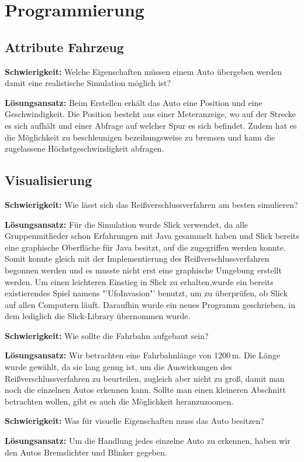 \chapter{Programmierung}
\section{Attribute Fahrzeug}
\textbf{Schwierigkeit:} Welche Eigenschaften müssen einem Auto übergeben werden damit eine realistische Simulation möglich ist?
\begin{addmargin}[25pt]{0pt}
	\item \textbf{Lösungsansatz:} Beim Erstellen erhält das Auto eine Position und eine Geschwindigkeit. Die Position besteht aus einer Meteranzeige, wo auf der Strecke es sich aufhält und einer Abfrage auf welcher Spur es sich befindet. Zudem hat es die Möglichkeit zu beschleunigen bezeihungsweise zu bremsen und kann die zugelassene Höchstgeschwindigkeit abfragen. \\
\end{addmargin}

\section{Visualisierung}
\textbf{Schwierigkeit:} Wie lässt sich das Reißverschlussverfahren am besten simulieren?
\begin{addmargin}[25pt]{0pt}
	\item \textbf{Lösungsansatz:} Für die Simulation wurde Slick verwendet, da alle Gruppenmitlieder schon Erfahrungen mit Java gesammelt haben und Slick bereits eine graphische Oberfläche für Java besitzt, auf die zugegriffen werden konnte. Somit konnte gleich mit der Implementierung des Reißverschlussverfahren begonnen werden und es musste nicht erst eine graphische Umgebung erstellt werden. Um einen leichteren Einstieg in Slick zu erhalten,wurde ein bereits existierendes Spiel namens "'UfoInvasion"' benutzt, um zu überprüfen, ob Slick auf allen Computern läuft. Daraufhin wurde ein neues Programm geschrieben, in dem lediglich die Slick-Library übernommen wurde. \\
\end{addmargin}
\textbf{Schwierigkeit:} Wie sollte die Fahrbahn aufgebaut sein?
\begin{addmargin}[25pt]{0pt}
	\item \textbf{Lösungsansatz:} Wir betrachten eine Fahrbahnlänge von 1200\,m. Die Länge wurde gewählt, da sie lang genug ist, um die Auswirkungen des Reißverschlussverfahren zu beurteilen, zugleich aber nicht zu groß, damit man noch die einzelnen Autos erkennen kann. Sollte man einen kleineren Abschnitt betrachten wollen, gibt es auch die Möglichkeit heranzuzoomen.\\
\end{addmargin}
\textbf{Schwierigkeit:} Was für visuelle Eigenschaften muss das Auto besitzen?
\begin{addmargin}[25pt]{0pt}
	\item \textbf{Lösungsansatz:} Um die Handlung jedes einzelne Auto zu erkennen, haben wir den Autos Bremslichter und Blinker gegeben.\\
\end{addmargin}

